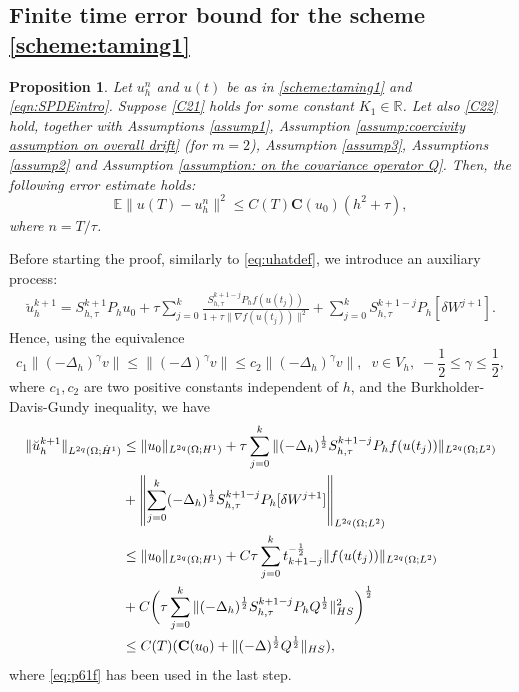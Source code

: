 \documentclass[reqno, 11pt]{amsart}
\theoremstyle{plain}
\newtheorem{proposition}[theorem]{Proposition}
\theoremstyle{definition}
\theoremstyle{remark}
\numberwithin{equation}{section}
\numberwithin{theorem}{section}
\newcommand{\R}{\mathbb{R}}
\newcommand{\con}{\mathbf{C}}
\begin{document}
{\subsection{Finite time error bound for the scheme \eqref{scheme:taming1}}\label{subsec: tamed H2}
\begin{proposition}\label{Prop: one time  step estimate taming1}
Let $u_h^n$ and $u(t)$ be as in \eqref{scheme:taming1} and \eqref{eqn:SPDEintro}.  Suppose  \eqref{C21} holds for some constant $K_1 \in \R$.  Let also \eqref{C22} hold, together with Assumptions \ref{assump1}, Assumption \ref{assump:coercivity assumption on overall drift} (for $m=2$), Assumption \ref{assump3}, Assumptions \ref{assump2} and Assumption \ref{assumption: on the covariance operator Q}. Then, the following error estimate holds:
\begin{equation}\label{eqn:finite time bound for our scheme}
\mathbb E \|u(T) -u_h^n \|^2 \leq C(T) \con(u_0)(h^2+\tau),
\end{equation}
  where $n=T/\tau$. 
\end{proposition}
Before starting the proof, similarly to \eqref{eq:uhatdef}, we introduce an auxiliary process: %
\begin{align}\label{aux}
\breve{u}_h^{k+1}=S_{h,\tau}^{k+1}P_hu_0+\tau\sum\limits_{j=0}^k \frac{S_{h,\tau}^{k+1-j}P_hf(u(t_j))}{1+\tau\|\nabla f(u(t_j))\|^2}+\sum\limits_{j=0}^k S_{h,\tau}^{k+1-j}P_h[\delta W^{j+1}].
\end{align}
Hence, using the equivalence \cite{anderssonL16}
$$c_1\|(-\Delta_h)^\gamma v\|\leq \|(-\Delta)^\gamma v\|\leq c_2\|(-\Delta_h)^\gamma v\|,\;\; v\in V_h, \; -\frac{1}{2}\leq\gamma\leq \frac{1}{2}, $$
 where $c_1,c_2$ are two positive constants independent of $h$, and the Burkholder-Davis-Gundy inequality, we have
\begin{align}\label{eq:hatu}
\|\breve{u}_h^{k+1}\|_{L^{2q}(\Omega;\dot{H}^1)}&\leq \|u_0\|_{L^{2q}(\Omega;H^1)}+\tau \sum\limits_{j=0}^k \|(-\Delta_h)^{\frac{1}{2}}S_{h,\tau}^{k+1-j}P_hf(u(t_j))\|_{L^{2q}(\Omega;L^2)}\notag\\
&+\left\|\sum\limits_{j=0}^k(-\Delta_h)^{\frac{1}{2}}S_{h,\tau}^{k+1-j}P_h[\delta W^{j+1}]\right\|_{L^{2q}(\Omega;L^2)} \notag\\
&\leq \|u_0\|_{L^{2q}(\Omega;H^1)}+C\tau\sum\limits_{j=0}^k t_{k+1-j}^{-\frac{1}{2}}\|f(u(t_j))\|_{L^{2q}(\Omega;L^2)}\notag\\
&+C\bigg(\tau\sum\limits_{j=0}^k \|(-\Delta_h)^{\frac{1}{2}}S_{h,\tau}^{k+1-j}P_hQ^{\frac{1}{2}}\|^2_{HS}\bigg)^{\frac{1}{2}}\notag\\
&\leq C(T) (\con(u_0) +\|(-\Delta)^{\frac{1}{2}}Q^{\frac{1}{2}}\|_{HS}), 
\end{align}
where \eqref{eq:p61f} has been used in the last step.

}
\end{document}
